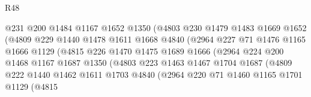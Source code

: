 \begin{lexlean}{R48}
\begin{coremodule}
                              @231
                              @200
                              @1484
                              @1167
                              @1652
                              @1350
                              (@4803
                                @230
                                @1479
                                @1483
                                @1669
                                @1652
                                (@4809
                                  @229
                                  @1440
                                  @1478
                                  @1611
                                  @1668
                                  @4840
                                  (@2964
                                    @227
                                    @71
                                    @1476
                                    @1165
                                    @1666
                                    @1129
                                    (@4815
                                      @226
                                      @1470
                                      @1475
                                      @1689
                                      @1666
                                      (@2964
                                        @224
                                        @200
                                        @1468
                                        @1167
                                        @1687
                                        @1350
                                        (@4803
                                          @223
                                          @1463
                                          @1467
                                          @1704
                                          @1687
                                          (@4809
                                            @222
                                            @1440
                                            @1462
                                            @1611
                                            @1703
                                            @4840
                                            (@2964
                                              @220
                                              @71
                                              @1460
                                              @1165
                                              @1701
                                              @1129
                                              (@4815

\end{coremodule}
\end{lexlean}
